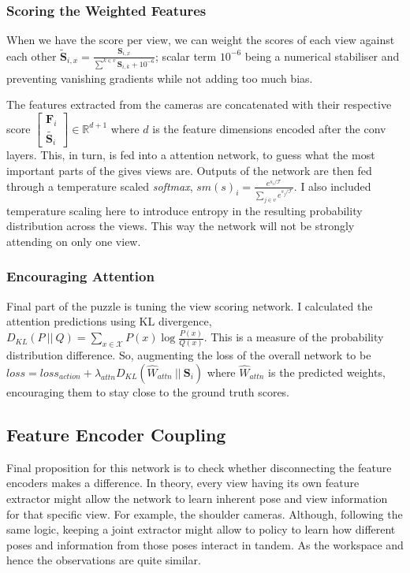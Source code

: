 \subsubsection{Scoring the Weighted Features}
When we have the score per view, we can weight the scores of each view against each other
\( \tilde{\mathbf{S}}_{i, x} = \frac{\mathbf{S}_{i, x}}{\sum_{}^{k \in v} \mathbf{S}_{i, k} + 10^{-6}} \); scalar term $10^{-6}$ being a numerical stabiliser and preventing vanishing gradients while not adding too much bias.

The features extracted from the cameras are concatenated with their respective score \( \begin{bmatrix} \mathbf{F}_i \\ \tilde{\mathbf{S}_i} \end{bmatrix} \in \mathbb{R}^{d + 1}\) where $d$ is the feature dimensions encoded after the conv layers. This, in turn, is fed into a attention network, to guess what the most important parts of the gives views are. Outputs of the network are then fed through a temperature scaled \emph{softmax}, \(sm\left(s\right)_i = \frac{e^{s_i / \mathcal{T}}}{\sum_{j \in v}{e^{s_j / \mathcal{T}}}}\). I also included temperature scaling here to introduce entropy in the resulting probability distribution across the views. This way the network will not be strongly attending on only one view.

\subsubsection{Encouraging Attention}
Final part of the puzzle is tuning the view scoring network. I calculated the attention predictions using KL divergence, \(D_{KL}\left(P ~||~ Q\right) = \sum_{x \in \mathcal{X}} P\left(x\right) \log \frac{P\left(x\right)}{Q\left(x\right)}\). This is a measure of the probability distribution difference. So, augmenting the loss of the overall network to be \(loss = loss_{action} + \lambda_{attn} D_{KL}\left( \hat{W}_{attn} ~||~ \mathbf{S}_i\right)\) where $\hat{W}_{attn}$ is the predicted weights, encouraging them to stay close to the ground truth scores.

\subsection{Feature Encoder Coupling}
Final proposition for this network is to check whether disconnecting the feature encoders makes a difference. In theory, every view having its own feature extractor might allow the network to learn inherent pose and view information for that specific view. For example, the shoulder cameras.  Although, following the same logic, keeping a joint extractor might allow to policy to learn how different poses and information from those poses interact in tandem. As the workspace and hence the observations are quite similar.

